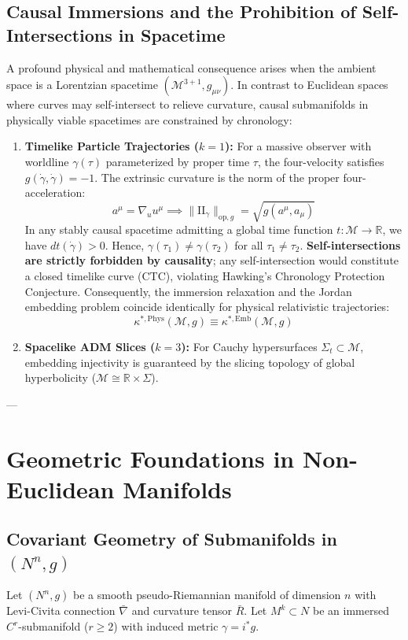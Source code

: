 \documentclass[11pt,reqno]{amsart}
\theoremstyle{definition}
\providecommand{\R}{\mathbb{R}}
\providecommand{\II}{\mathrm{I\!I}}
\newcommand{\op}{\mathrm{op}}
\numberwithin{equation}{section}
\providecommand{\II}{\mathrm{II}}
\providecommand{\R}{\mathbb{R}}
\begin{document}
\subsection{Causal Immersions and the Prohibition of Self-Intersections in Spacetime}
\label{subsec:causality_self_intersection}
A profound physical and mathematical consequence arises when the ambient space is a Lorentzian spacetime $(\mathcal{M}^{3+1}, g_{\mu\nu})$. In contrast to Euclidean spaces where curves may self-intersect to relieve curvature, causal submanifolds in physically viable spacetimes are constrained by chronology:
\begin{enumerate}
    \item \textbf{Timelike Particle Trajectories ($k=1$):} For a massive observer with worldline $\gamma(\tau)$ parameterized by proper time $\tau$, the four-velocity satisfies $g(\dot{\gamma}, \dot{\gamma}) = -1$. The extrinsic curvature is the norm of the proper four-acceleration:
    \begin{equation}
    a^\mu = \nabla_u u^\mu \implies \|\II_\gamma\|_{\op, g} = \sqrt{g(a^\mu, a_\mu)}
    \end{equation}
    In any stably causal spacetime admitting a global time function $t: \mathcal{M} \to \R$, we have $dt(\dot{\gamma}) > 0$. Hence, $\gamma(\tau_1) \ne \gamma(\tau_2)$ for all $\tau_1 \ne \tau_2$. \textbf{Self-intersections are strictly forbidden by causality}; any self-intersection would constitute a closed timelike curve (CTC), violating Hawking's Chronology Protection Conjecture. Consequently, the immersion relaxation and the Jordan embedding problem coincide identically for physical relativistic trajectories:
    \begin{equation}
    \kappa^{*,\mathrm{Phys}}(\mathcal{M}, g) \equiv \kappa^{*,\mathrm{Emb}}(\mathcal{M}, g)
    \end{equation}
    \item \textbf{Spacelike ADM Slices ($k=3$):} For Cauchy hypersurfaces $\Sigma_t \subset \mathcal{M}$, embedding injectivity is guaranteed by the slicing topology of global hyperbolicity ($\mathcal{M} \cong \R \times \Sigma$).
\end{enumerate}

---

\section{Geometric Foundations in Non-Euclidean Manifolds}

\subsection{Covariant Geometry of Submanifolds in \texorpdfstring{$(N^n, g)$}{(N\textasciicircum n, g)}}
Let $(N^n, g)$ be a smooth pseudo-Riemannian manifold of dimension $n$ with Levi-Civita connection $\bar{\nabla}$ and curvature tensor $\bar{R}$. Let $M^k \subset N$ be an immersed $C^r$-submanifold ($r \ge 2$) with induced metric $\gamma = i^* g$.
\end{document}
